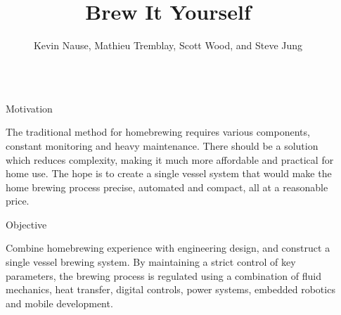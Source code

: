 \documentclass[final]{beamer}
\title{Brew It Yourself} %
\author{Kevin Nause, Mathieu Tremblay, Scott Wood, and Steve Jung} %
\institute{Department of Electrical and Computer Engineering, University of Waterloo} %
\newlength{\sepwid}
\newlength{\onecolwid}
\begin{document}

\setlength{\belowcaptionskip}{2ex} %
\setlength\belowdisplayshortskip{2ex} %

\begin{frame}[t] %

\begin{columns}[t] %

\begin{column}{\sepwid}\end{column} %

\begin{column}{\onecolwid} %


\begin{block}{Motivation}

The traditional method for homebrewing requires various components, constant monitoring and heavy maintenance. There should be a solution which reduces complexity, making it much more affordable and practical for home use. The hope is to create a single vessel system that would make the home brewing process precise, automated and compact, all at a reasonable price.

\end{block}


\begin{block}{Objective}

Combine homebrewing experience with engineering design, and construct a single vessel brewing system. By maintaining a strict control of key parameters, the brewing process is regulated using a combination of fluid mechanics, heat transfer, digital controls, power systems, embedded robotics and mobile development.


\end{block}
\end{column}
\end{columns}
\end{frame}
\end{document}
